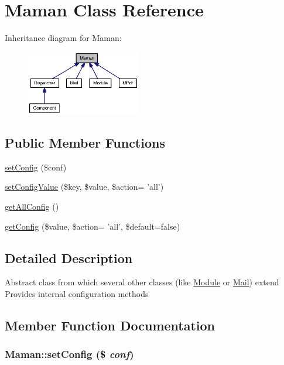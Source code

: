 \hypertarget{classMaman}{
\section{Maman Class Reference}
\label{classMaman}
}
Inheritance diagram for Maman:\nopagebreak
\begin{figure}[H]
\begin{center}
\leavevmode
\includegraphics[width=141pt]{classMaman__inherit__graph}
\end{center}
\end{figure}
\subsection*{Public Member Functions}
\begin{CompactItemize}
\item 
\hyperlink{classMaman_fe5c4f994412b09a0f9c81f321f1fb0d}{setConfig} (\$conf)
\item 
\hyperlink{classMaman_40fc78b70fd28c5dd4443c4980c0d537}{setConfigValue} (\$key, \$value, \$action= 'all')
\item 
\hyperlink{classMaman_e3137d9634b06c493ad9626b558e851f}{getAllConfig} ()
\item 
\hyperlink{classMaman_ef4fcde3f5213d79a16b471788934436}{getConfig} (\$value, \$action= 'all', \$default=false)
\end{CompactItemize}


\subsection{Detailed Description}
Abstract class from which several other classes (like \hyperlink{classModule}{Module} or \hyperlink{classMail}{Mail}) extend Provides internal configuration methods 

\subsection{Member Function Documentation}
\hypertarget{classMaman_fe5c4f994412b09a0f9c81f321f1fb0d}{
\subsubsection[setConfig]{\setlength{\rightskip}{0pt plus 5cm}Maman::setConfig (\$ {\em conf})}}
\label{classMaman_fe5c4f994412b09a0f9c81f321f1fb0d}


